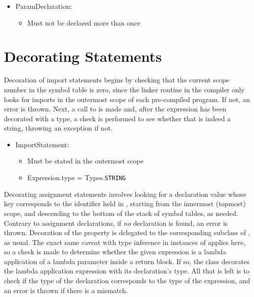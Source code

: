 \begin{itemize}
	\item ParamDeclaration:
		\begin{itemize}
			\item Must not be declared more than once
		\end{itemize}
\end{itemize}

\section{Decorating Statements}

Decoration of import statements begins by checking that the current scope number in the symbol table is zero, since the linker routine in the compiler only looks for imports in the outermost scope of each pre-compiled program. If not, an error is thrown. Next, a call to  is made and, after the expression has been decorated with a type, a check is performed to see whether that is indeed a string, throwing an exception if not.

\begin{itemize}
	\item ImportStatement:
		\begin{itemize}
			\item Must be stated in the outermost scope
			\item Expression.type = Types.\texttt{STRING}
		\end{itemize}
\end{itemize}

Decorating assignment statements involves looking for a declaration value whose key corresponds to the identifier held in , starting from the innermost (topmost) scope, and descending to the bottom of the stack of symbol tables, as needed. Contrary to assignment declarations, if \emph{no} declaration is found, an error is thrown. Decoration of the  property is delegated to the corresponding subclass of , as usual. The exact same caveat with type inference in instances of  applies here, so a check is made to determine whether the given expression is a lambda application of a lambda parameter inside a return block. If so, the  class decorates the lambda application expression with its declaration's type. All that is left is to check if the type of the declaration corresponds to the type of the expression, and an error is thrown if there is a mismatch.

